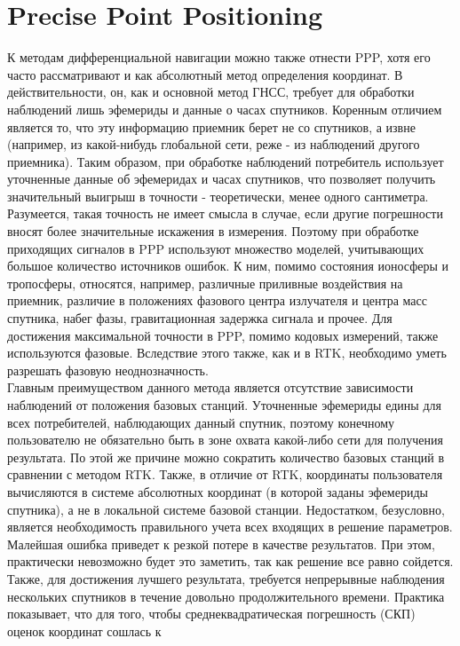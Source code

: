 \documentclass[a4paper,12pt]{report}
\begin{document}
\section*{Precise Point Positioning}
К методам дифференциальной навигации можно также отнести PPP, хотя его часто рассматривают и как абсолютный метод определения координат. 
В действительности, он, как и основной метод ГНСС, требует для обработки наблюдений лишь эфемериды и данные о часах спутников. Коренным 
отличием является то, что эту информацию приемник берет не со спутников, а извне (например, из какой-нибудь глобальной сети, реже - из 
наблюдений другого приемника). Таким образом, при обработке наблюдений потребитель использует уточненные данные об эфемеридах и часах 
спутников, что позволяет получить значительный выигрыш в точности - теоретически, менее одного сантиметра. Разумеется, такая точность не 
имеет смысла в случае, если другие погрешности вносят более значительные искажения в измерения. Поэтому при обработке приходящих сигналов в 
PPP используют множество моделей, учитывающих большое количество источников ошибок. К ним, помимо состояния ионосферы и тропосферы, относятся, 
например, различные приливные воздействия на приемник, различие в положениях фазового центра излучателя и центра масс спутника, набег фазы, 
гравитационная задержка сигнала и прочее.\cite{karut-stat} Для достижения максимальной точности в PPP, помимо кодовых измерений, 
также используются фазовые. Вследствие этого также, как и в RTK, необходимо уметь разрешать фазовую неоднозначность. \\
Главным преимуществом данного метода является отсутствие зависимости наблюдений от положения базовых станций. Уточненные эфемериды едины для 
всех потребителей, наблюдающих данный спутник, поэтому конечному пользователю не обязательно быть в зоне охвата какой-либо сети для получения 
результата. По этой же причине можно сократить количество базовых станций в сравнении с методом RTK. Также, в отличие от RTK, координаты 
пользователя вычисляются в системе абсолютных координат (в которой заданы эфемериды спутника), а не в локальной системе базовой станции. 
Недостатком, безусловно, является необходимость правильного учета всех входящих в решение параметров. Малейшая ошибка приведет к резкой 
потере в качестве результатов. При этом, практически невозможно будет это заметить, так как решение все равно сойдется.
Также, для достижения лучшего результата, требуется непрерывные наблюдения нескольких спутников в течение 
довольно продолжительного времени. Практика показывает, что для того, чтобы среднеквадратическая погрешность (СКП) оценок координат сошлась к 
\end{document}
